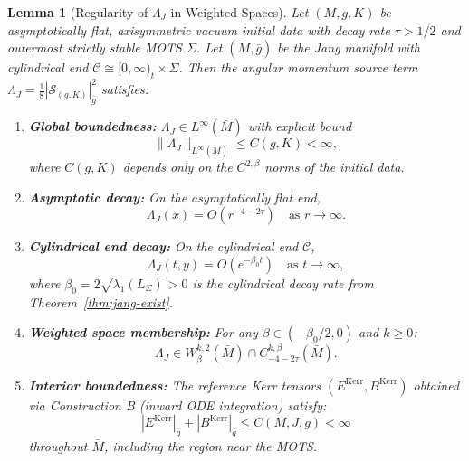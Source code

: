 \documentclass[12pt]{article}
\theoremstyle{plain}
\newtheorem{lemma}[theorem]{Lemma}
\theoremstyle{definition}
\theoremstyle{remark}
\newcommand{\bg}{\bar{g}}
\newcommand{\bM}{\bar{M}}
\newcommand{\Hoelder}{\beta}
\begin{document}
\begin{lemma}[Regularity of $\Lambda_J$ in Weighted Spaces]\label{lem:Lambda-J-regularity}
Let $(M, g, K)$ be asymptotically flat, axisymmetric vacuum initial data with decay rate $\tau > 1/2$ and outermost strictly stable MOTS $\Sigma$. Let $(\bM, \bg)$ be the Jang manifold with cylindrical end $\mathcal{C} \cong [0,\infty)_t \times \Sigma$. Then the angular momentum source term $\Lambda_J = \frac{1}{8}|\mathcal{S}_{(g,K)}|^2_{\bg}$ satisfies:
\begin{enumerate}[label=\textup{(\roman*)}]
    \item \textbf{Global boundedness:} $\Lambda_J \in L^\infty(\bM)$ with explicit bound
    \[
    \|\Lambda_J\|_{L^\infty(\bM)} \leq C(g, K) < \infty,
    \]
    where $C(g, K)$ depends only on the $C^{2,\Hoelder}$ norms of the initial data.
    
    \item \textbf{Asymptotic decay:} On the asymptotically flat end,
    \[
    \Lambda_J(x) = O(r^{-4-2\tau}) \quad \text{as } r \to \infty.
    \]
    
    \item \textbf{Cylindrical end decay:} On the cylindrical end $\mathcal{C}$,
    \[
    \Lambda_J(t, y) = O(e^{-\beta_0 t}) \quad \text{as } t \to \infty,
    \]
    where $\beta_0 = 2\sqrt{\lambda_1(L_\Sigma)} > 0$ is the cylindrical decay rate from Theorem~\ref{thm:jang-exist}.
    
    \item \textbf{Weighted space membership:} For any $\beta \in (-\beta_0/2, 0)$ and $k \geq 0$:
    \[
    \Lambda_J \in W^{k,2}_\beta(\bM) \cap C^{k,\Hoelder}_{-4-2\tau}(\bM).
    \]
    
    \item \textbf{Interior boundedness:} The reference Kerr tensors $(E^{\mathrm{Kerr}}, B^{\mathrm{Kerr}})$ obtained via Construction B (inward ODE integration) satisfy:
    \[
    |E^{\mathrm{Kerr}}|_{\bg} + |B^{\mathrm{Kerr}}|_{\bg} \leq C(M, J, g) < \infty
    \]
    throughout $\bM$, including the region near the MOTS.
\end{enumerate}
\end{lemma}
\end{document}
